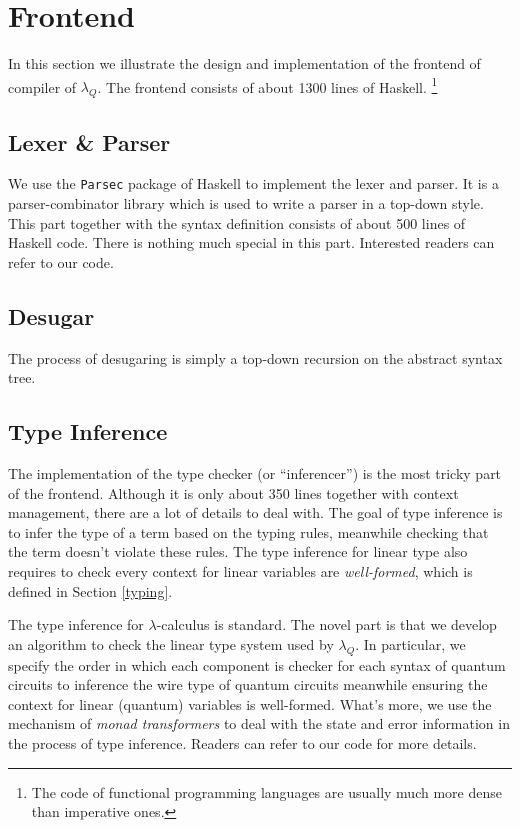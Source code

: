 \section{Frontend}\label{front}
In this section we illustrate the design and implementation of the frontend of compiler of $\lambda_Q$.
The frontend consists of about 1300 lines of Haskell.
\footnote{The code of functional programming languages are usually much more dense than imperative ones.}

\subsection{Lexer \& Parser}
We use the \texttt{Parsec} package of Haskell to implement the lexer and parser.
It is a parser-combinator library which is used to write a parser in a top-down style.
This part together with the syntax definition consists of about 500 lines of Haskell code.
There is nothing much special in this part. Interested readers can refer to our code.

\subsection{Desugar}
The process of desugaring is simply a top-down recursion on the abstract syntax tree.

\subsection{Type Inference}
The implementation of the type checker (or ``inferencer'') is the most tricky part of the frontend.
Although it is only about 350 lines together with context management, there are a lot of details to deal with.
The goal of type inference is to infer the type of a term based on the typing rules, meanwhile checking that the term doesn't violate these rules.
The type inference for linear type also requires to check every context for linear variables are \textit{well-formed}, which is defined in Section \ref{typing}.

The type inference for $\lambda$-calculus is standard.
The novel part is that we develop an algorithm to check the linear type system used by $\lambda_Q$.
In particular, we specify the order in which each component is checker for each syntax of quantum circuits to inference the wire type of quantum circuits meanwhile ensuring the context for linear (quantum) variables is well-formed.
What's more, we use the mechanism of \textit{monad transformers} to deal with the state and error information in the process of type inference.
Readers can refer to our code for more details.

